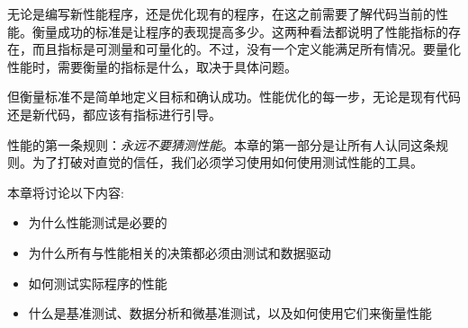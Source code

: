 无论是编写新性能程序，还是优化现有的程序，在这之前需要了解代码当前的性能。衡量成功的标准是让程序的表现提高多少。这两种看法都说明了性能指标的存在，而且指标是可测量和可量化的。不过，没有一个定义能满足所有情况。要量化性能时，需要衡量的指标是什么，取决于具体问题。

但衡量标准不是简单地定义目标和确认成功。性能优化的每一步，无论是现有代码还是新代码，都应该有指标进行引导。

性能的第一条规则：\textit{永远不要猜测性能}。本章的第一部分是让所有人认同这条规则。为了打破对直觉的信任，我们必须学习使用如何使用测试性能的工具。

本章将讨论以下内容:

\begin{itemize}
\item 为什么性能测试是必要的
\item 为什么所有与性能相关的决策都必须由测试和数据驱动
\item 如何测试实际程序的性能
\item 什么是基准测试、数据分析和微基准测试，以及如何使用它们来衡量性能
\end{itemize}

